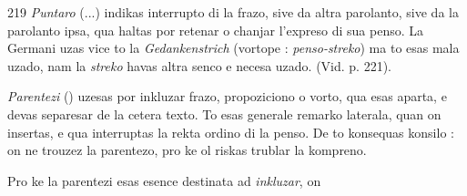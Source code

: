 \begin{VUpage}[223]{219}
\textit{Puntaro} (...) indikas interrupto di la frazo, sive da altra\nl
parolanto, sive da la parolanto ipsa, qua haltas por retenar\nl
o chanjar l'expreso di sua penso. La Germani uzas vice to\nl
la \textit{Gedankenstrich} (vortope : \textit{penso-streko}) ma to esas mala\nl
uzado, nam la \textit{streko} havas altra senco e necesa uzado. (Vid.\nl
p. 221).

\textit{Parentezi} () uzesas por inkluzar frazo, propoziciono o\nl
vorto, qua esas aparta, e devas separesar de la cetera texto.\nl
To esas generale remarko laterala, quan on insertas, e qua\nl
interruptas la rekta ordino di la penso. De to konsequas\nl
konsilo : on ne trouzez la parentezo, pro ke ol riskas trublar\nl
la kompreno.

Pro ke la parentezi esas esence destinata ad \textit{inkluzar}, on\nl
\end{VUpage}

